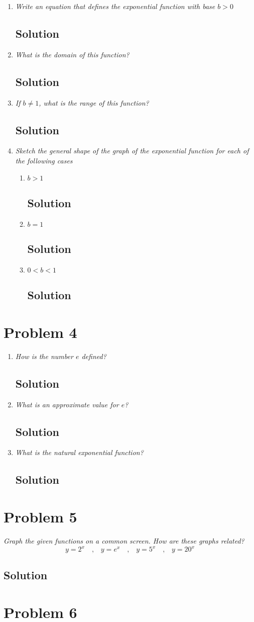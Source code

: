 \documentclass[11pt]{article}
\newcommand{\soln}{\subsection*}
\newcommand{\qn}{\textit}
\newcommand{\eqtext}[1]{\quad\text{#1}\quad}
\begin{document}
\begin{enumerate}
	\item \qn{Write an equation that defines the exponential function with base $b>0$}
	\soln{Solution}
	
	\item \qn{What is the domain of this function?}
	\soln{Solution}
	
	\item \qn{If $b \ne 1$, what is the range of this function?}
	\soln{Solution}
	
	\item \qn{Sketch the general shape of the graph of the exponential function for each of the following cases}
	\begin{enumerate}
		\item \qn{$b>1$}
		\soln{Solution}
		
		\item \qn{$b=1$}
		\soln{Solution}
		
		\item \qn{$0<b<1$}
		\soln{Solution}
	\end{enumerate}
\end{enumerate}

\section*{Problem 4}

\begin{enumerate}
	\item \qn{How is the number $e$ defined?}
	\soln{Solution}
	
	\item \qn{What is an approximate value for $e$?}
	\soln{Solution}
	
	\item \qn{What is the natural exponential function?}
	\soln{Solution}
\end{enumerate}

\section*{Problem 5}

\qn{Graph the given functions on a common screen. How are these graphs related? $$y=2^x \eqtext{,} y=e^x \eqtext{,} y=5^x \eqtext{,} y=20^x$$}

\soln{Solution}

\section*{Problem 6}
\end{document}
